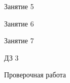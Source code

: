 \begin{class}[number=5]
	\begin{listofex}
		\item Занятие 5
	\end{listofex}
\end{class}

\begin{class}[number=6]
	\begin{listofex}
		\item Занятие 6
	\end{listofex}
\end{class}

\begin{class}[number=7]
	\begin{listofex}
		\item Занятие 7
	\end{listofex}
\end{class}

\begin{homework}[number=3]
	\begin{listofex}
		\item ДЗ 3
	\end{listofex}
\end{homework}

\begin{exam}
	\begin{listofex}
		\item Проверочная работа
	\end{listofex}
\end{exam}
